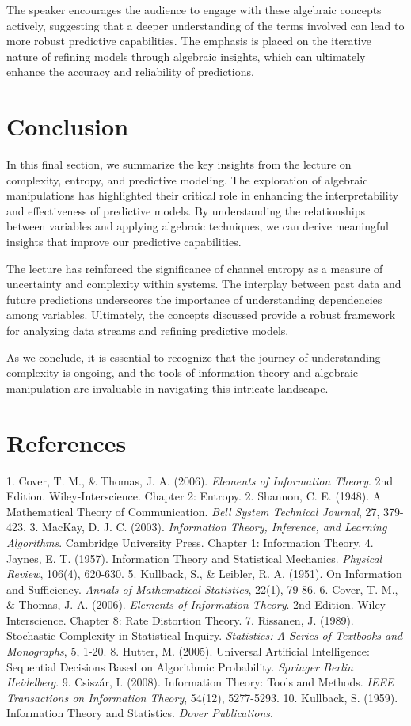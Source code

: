 \documentclass[a4paper]{article}
\begin{document}
The speaker encourages the audience to engage with these algebraic concepts actively, suggesting that a deeper understanding of the terms involved can lead to more robust predictive capabilities. The emphasis is placed on the iterative nature of refining models through algebraic insights, which can ultimately enhance the accuracy and reliability of predictions.

\section{Conclusion}
In this final section, we summarize the key insights from the lecture on complexity, entropy, and predictive modeling. The exploration of algebraic manipulations has highlighted their critical role in enhancing the interpretability and effectiveness of predictive models. By understanding the relationships between variables and applying algebraic techniques, we can derive meaningful insights that improve our predictive capabilities.

The lecture has reinforced the significance of channel entropy as a measure of uncertainty and complexity within systems. The interplay between past data and future predictions underscores the importance of understanding dependencies among variables. Ultimately, the concepts discussed provide a robust framework for analyzing data streams and refining predictive models.

As we conclude, it is essential to recognize that the journey of understanding complexity is ongoing, and the tools of information theory and algebraic manipulation are invaluable in navigating this intricate landscape.

\section{References}
1. Cover, T. M., \& Thomas, J. A. (2006). \textit{Elements of Information Theory}. 2nd Edition. Wiley-Interscience. Chapter 2: Entropy.
2. Shannon, C. E. (1948). A Mathematical Theory of Communication. \textit{Bell System Technical Journal}, 27, 379-423.
3. MacKay, D. J. C. (2003). \textit{Information Theory, Inference, and Learning Algorithms}. Cambridge University Press. Chapter 1: Information Theory.
4. Jaynes, E. T. (1957). Information Theory and Statistical Mechanics. \textit{Physical Review}, 106(4), 620-630.
5. Kullback, S., \& Leibler, R. A. (1951). On Information and Sufficiency. \textit{Annals of Mathematical Statistics}, 22(1), 79-86.
6. Cover, T. M., \& Thomas, J. A. (2006). \textit{Elements of Information Theory}. 2nd Edition. Wiley-Interscience. Chapter 8: Rate Distortion Theory.
7. Rissanen, J. (1989). Stochastic Complexity in Statistical Inquiry. \textit{Statistics: A Series of Textbooks and Monographs}, 5, 1-20.
8. Hutter, M. (2005). Universal Artificial Intelligence: Sequential Decisions Based on Algorithmic Probability. \textit{Springer Berlin Heidelberg}.
9. Csiszár, I. (2008). Information Theory: Tools and Methods. \textit{IEEE Transactions on Information Theory}, 54(12), 5277-5293.
10. Kullback, S. (1959). Information Theory and Statistics. \textit{Dover Publications}.
\end{document}
